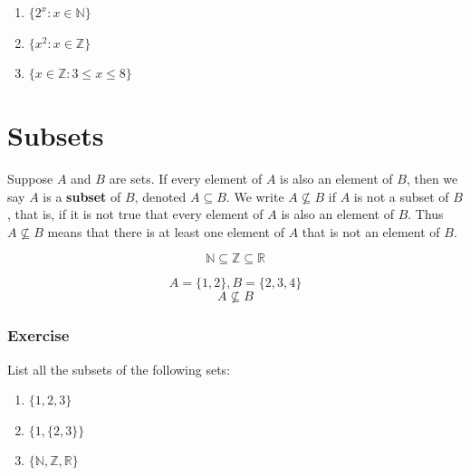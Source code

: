 \documentclass[
  letterpaper,
  DIV=11,
  numbers=noendperiod]{scrreprt}
\providecommand{\tightlist}{%
  \setlength{\itemsep}{0pt}\setlength{\parskip}{0pt}}\usepackage{longtable,booktabs,array}
\begin{document}
\begin{tcolorbox}[enhanced jigsaw, toprule=.15mm, leftrule=.75mm, coltitle=black, left=2mm, opacityback=0, titlerule=0mm, arc=.35mm, toptitle=1mm, opacitybacktitle=0.6, bottomtitle=1mm, colframe=quarto-callout-tip-color-frame, title=\textcolor{quarto-callout-tip-color}{\faLightbulb}\hspace{0.5em}{Solution}, rightrule=.15mm, bottomrule=.15mm, colbacktitle=quarto-callout-tip-color!10!white, breakable, colback=white]

\begin{enumerate}
\def\labelenumi{\arabic{enumi}.}
\tightlist
\item
  \(\{ 2^x: x \in \mathbb{N} \}\)
\item
  \(\{ x^2: x \in \mathbb{Z} \}\)
\item
  \(\{ x \in \mathbb{Z}: 3 \le x \le 8 \}\)
\end{enumerate}

\end{tcolorbox}

\section{Subsets}\label{subsets}

Suppose \(A\) and \(B\) are sets. If every element of \(A\) is also an
element of \(B\), then we say \(A\) is a \textbf{subset} of \(B\),
denoted \(A \subseteq B\). We write \(A \not\subseteq B\) if \(A\) is
not a subset of \(B\), that is, if it is not true that every element of
\(A\) is also an element of \(B\). Thus \(A \not\subseteq B\) means that
there is at least one element of \(A\) that is not an element of \(B\).

\[
\mathbb{N} \subseteq \mathbb{Z} \subseteq \mathbb{R}
\]

\[
A = \{1,2\}, B = \{2,3,4\}
\] \[
A \not\subseteq B
\]

\subsubsection{Exercise}\label{exercise-1}

List all the subsets of the following sets:

\begin{enumerate}
\def\labelenumi{\arabic{enumi}.}
\tightlist
\item
  \(\{1,2,3\}\)
\item
  \(\{1,\{2,3\}\}\)
\item
  \(\{\mathbb{N}, \mathbb{Z}, \mathbb{R}\}\)
\end{enumerate}
\end{document}
